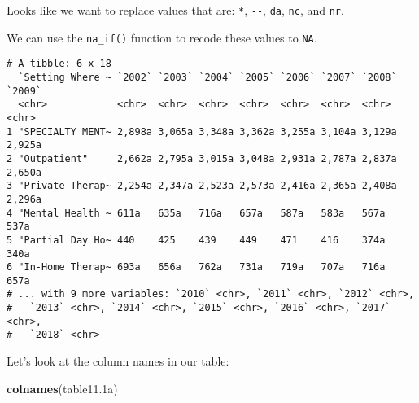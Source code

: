 \documentclass[
]{article}
\newenvironment{Shaded}{\begin{snugshade}}{\end{snugshade}}
\newcommand{\FloatTok}[1]{\textcolor[rgb]{0.00,0.00,0.81}{#1}}
\newcommand{\KeywordTok}[1]{\textcolor[rgb]{0.13,0.29,0.53}{\textbf{#1}}}
\newcommand{\NormalTok}[1]{#1}
\newcommand{\OperatorTok}[1]{\textcolor[rgb]{0.81,0.36,0.00}{\textbf{#1}}}
\newcommand{\StringTok}[1]{\textcolor[rgb]{0.31,0.60,0.02}{#1}}
\begin{document}
Looks like we want to replace values that are: \texttt{*},
\texttt{-\/-}, \texttt{da}, \texttt{nc}, and \texttt{nr}.

We can use the \texttt{na\_if()} function to recode these values to
\texttt{NA}.

\begin{Shaded}
\end{Shaded}

\begin{verbatim}
# A tibble: 6 x 18
  `Setting Where ~ `2002` `2003` `2004` `2005` `2006` `2007` `2008` `2009`
  <chr>            <chr>  <chr>  <chr>  <chr>  <chr>  <chr>  <chr>  <chr> 
1 "SPECIALTY MENT~ 2,898a 3,065a 3,348a 3,362a 3,255a 3,104a 3,129a 2,925a
2 "Outpatient"     2,662a 2,795a 3,015a 3,048a 2,931a 2,787a 2,837a 2,650a
3 "Private Therap~ 2,254a 2,347a 2,523a 2,573a 2,416a 2,365a 2,408a 2,296a
4 "Mental Health ~ 611a   635a   716a   657a   587a   583a   567a   537a  
5 "Partial Day Ho~ 440    425    439    449    471    416    374a   340a  
6 "In-Home Therap~ 693a   656a   762a   731a   719a   707a   716a   657a  
# ... with 9 more variables: `2010` <chr>, `2011` <chr>, `2012` <chr>,
#   `2013` <chr>, `2014` <chr>, `2015` <chr>, `2016` <chr>, `2017` <chr>,
#   `2018` <chr>
\end{verbatim}

Let's look at the column names in our table:

\begin{Shaded}
\begin{Highlighting}[]
\KeywordTok{colnames}\NormalTok{(table11}\FloatTok{.1}\NormalTok{a)}
\end{Highlighting}
\end{Shaded}
\end{document}

